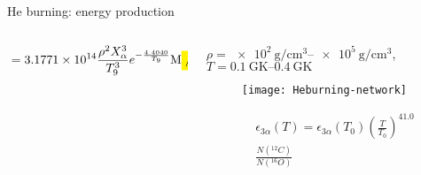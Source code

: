 \begin{frame}{He burning: energy production}
\begin{columns}[T]
\begin{column}{0.7\textwidth}
\begin{align*}
                &=\num{3.1771e14}\frac{\rho^2X_{\alpha}^3}{T_9^3}\exp{-\frac{4.4040}{T_9}}\si{\mega\ev\per\gram\per\second}
            \end{align*}
        \end{column}
        \begin{column}{0.3\textwidth}
            $\rho=\SIrange{e2}{e5}{\gram\per\cubic\cm}$, $T=\SIrange{0.1}{0.4}{\giga\kelvin}$
\begin{figure}[!ht]
    \texttt{[image: Heburning-network]}\label{fig:Heburning-network}
\end{figure}
    \begin{align*}
        &\epsilon_{3\alpha}(T)=\epsilon_{3\alpha}(T_0)(\frac{T}{T_0})^{41.0}\\
        &\frac{N(^{12}C)}{N(^{16}O)}\tag{universe}
    \end{align*}
        \end{column}
    \end{columns}
\end{frame}

